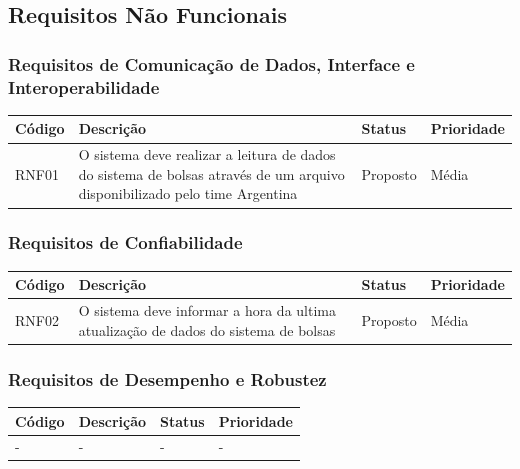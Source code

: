 \documentclass[a4paper, 12pt]{article}
\begin{document}
\subsection{Requisitos Não Funcionais}
\subsubsection{Requisitos de Comunicação de Dados, Interface e Interoperabilidade}
	\begin{table}[ht]
		\centering

		\begin{tabular}{p{2cm}p{7cm}p{2cm}p{2cm}}
			\hline
			\cellcolor{gray}Código&\cellcolor{gray}Descrição&\cellcolor{gray}Status&\cellcolor{gray}Prioridade  \\
			\hline
            RNF01&O sistema deve realizar a leitura de dados do sistema de bolsas atrav\'{e}s de um arquivo disponibilizado pelo time Argentina&Proposto&M\'{e}dia\\
			\hline
		\end{tabular}
	\end{table}%
\subsubsection{Requisitos de Confiabilidade}
\begin{table}[ht]
	\rowcolors{1}{}{}
	\centering

	\begin{tabular}{p{2cm}p{7cm}p{2cm}p{2cm}}
		\hline
		\cellcolor{gray}Código&\cellcolor{gray}Descrição&\cellcolor{gray}Status&\cellcolor{gray}Prioridade  \\
		\hline
        RNF02&O sistema deve informar a hora da ultima atualiza\c{c}\~{a}o de dados do sistema de bolsas&Proposto&M\'{e}dia\\
		\hline
	\end{tabular}
\end{table}%
\subsubsection{Requisitos de Desempenho e Robustez}
\begin{table}[ht]
	\centering

	\begin{tabular}{p{2cm}p{7cm}p{2cm}p{2cm}}
		\hline
		\cellcolor{gray}Código&\cellcolor{gray}Descrição&\cellcolor{gray}Status&\cellcolor{gray}Prioridade  \\
		\hline
		-&-&-&-\\
		\hline
	\end{tabular}
\end{table}
\newpage
\end{document}
